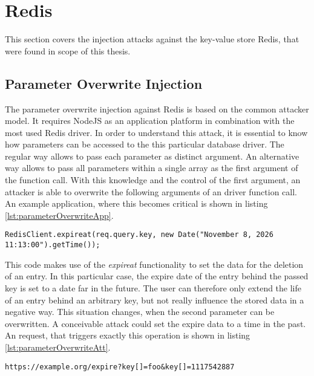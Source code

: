 \section{Redis}
This section covers the injection attacks against the key-value store Redis, that were found in scope of this thesis.

\subsection{Parameter Overwrite Injection}
The parameter overwrite injection against Redis is based on the common attacker model. It requires NodeJS as an application platform in combination with the most used Redis driver. In order to understand this attack, it is essential to know how parameters can be accessed to the this particular database driver. The regular way allows to pass each parameter as distinct argument. An alternative way allows to pass all parameters within a single array as the first argument of the function call. With this knowledge and the control of the first argument, an attacker is able to overwrite the following arguments of an driver function call. An example application, where this becomes critical is shown in listing \ref{lst:parameterOverwriteApp}. \\

\begin{lstlisting}[caption={Vulnerable NodeJS example for parameter overwrite injection on Redis}, label={lst:parameterOverwriteApp}]
RedisClient.expireat(req.query.key, new Date("November 8, 2026 11:13:00").getTime());
\end{lstlisting}

This code makes use of the \emph{expireat} functionality to set the data for the deletion of an entry. In this particular case, the expire date of the entry behind the passed key is set to a date far in the future. The user can therefore only extend the life of an entry behind an arbitrary key, but not really influence the stored data in a negative way. This situation changes, when the second parameter can be overwritten. A conceivable attack could set the expire data to a time in the past. An request, that triggers exactly this operation is shown in listing \ref{lst:parameterOverwriteAtt}. \\

\begin{lstlisting}[caption={Attack vector on Redis for query selector injection via HTTP GET}, label={lst:parameterOverwriteAtt}]
https://example.org/expire?key[]=foo&key[]=1117542887
\end{lstlisting}

